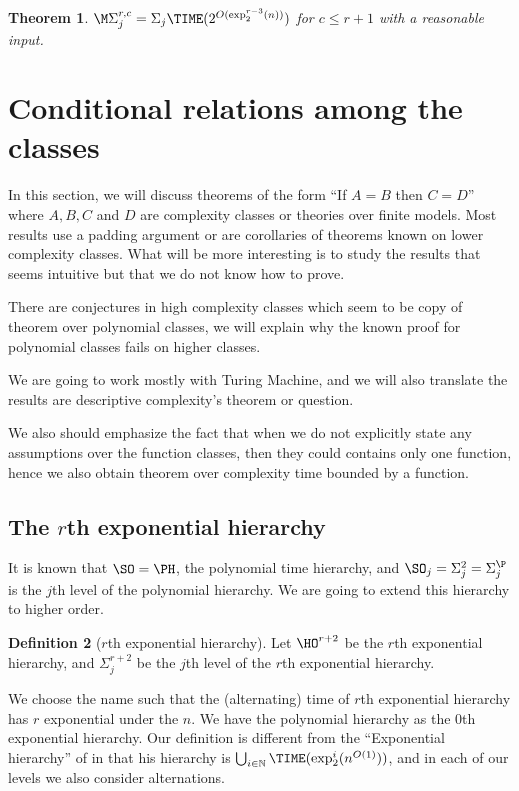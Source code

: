 \documentclass[a4paper,12pt]{article}
\newtheorem{theorem}{Theorem}[section]
\theoremstyle{definition}
\newtheorem{definition}[theorem]{Definition}
\newcommand{\ATIME}[2]{\ensuremath{\Sigma_{#2}\TIME(#1)}}
\newcommand{\hoa}[1]{\ensuremath{\HO^{#1}}}
\newcommand{\hob}[2]{\ensuremath{\Sigma^{#1}_{#2}}}
\newcommand{\mhoc}[3]{\ensuremath{\M\Sigma^{#1,#3}_{#2}}}
\begin{document}
\begin{theorem}\label{mho_t}
  $\mhoc rjc=\ATIME{2^{O(\exp^{r-3}_{2}(n))}}j$ for $c\le r+1$ with a
  reasonable input.
\end{theorem}









\section{Conditional relations among the classes}\label{cond}
In this section, we will discuss theorems of the form ``If $A=B$
then $C=D$'' where $A, B, C $ and $D$ are complexity classes or
theories over finite models.  Most results use a padding argument
or are corollaries of theorems known on lower complexity classes. What
will be more interesting is to study the results that seems intuitive
but that we do not know how to prove.

There are conjectures in high complexity classes which seem to be copy
of theorem over polynomial classes, we will explain why the known
proof for polynomial classes fails on higher classes.

We are going to work mostly with Turing Machine, and we will also
translate the results are descriptive complexity's theorem or
question.

We also should emphasize the fact that when we do not explicitly state
any assumptions over the function classes, then they could contains
only one function, hence we also obtain theorem over complexity time
bounded by a function.

\subsection{The $r$th exponential hierarchy}
It is known that $\SO=\PH$, the polynomial time hierarchy, and
$\SO_{j}=\hob{2}{j}=\Sigma^{\P}_{j}$ is the $j$th level of the
polynomial hierarchy. We are going to extend this hierarchy to higher
order.
\begin{definition}[$r$th exponential hierarchy]
  Let $\hoa{r+2}$ be the $r$th exponential hierarchy, and
  $\hob{r+2}{j}$ be the $j$th level of the $r$th exponential
  hierarchy.
\end{definition}
We choose the name such that the (alternating) time of $r$th
exponential hierarchy has $r$ exponential under the $n$.  We have the
polynomial hierarchy as the $0$th exponential
hierarchy. Our definition is different from the ``Exponential
hierarchy'' of \cite{pap} in that his hierarchy is
$\bigcup_{i\in\mathbb N}\TIME(\exp_{2}^{i}(n^{O(1)}))$, and in each of
our levels we also consider alternations.
\end{document}
